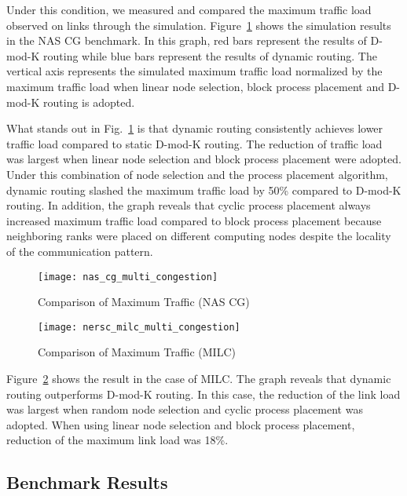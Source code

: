 Under this condition, we measured and compared the maximum traffic load
observed on links through the simulation.
Figure~\ref{fig:nas-cg-multi-congestion} shows the simulation results in
the NAS CG benchmark. In this graph, red bars represent the results of
\mbox{D-mod-K} routing while blue bars represent the results of dynamic
routing. The vertical axis represents the simulated maximum traffic load
normalized by the maximum traffic load when linear node selection, block
process placement and \mbox{D-mod-K} routing is adopted.

What stands out in Fig.~\ref{fig:nas-cg-multi-congestion} is that
dynamic routing consistently achieves lower traffic load compared to
static \mbox{D-mod-K} routing. The reduction of traffic load was largest
when linear node selection and block process placement were adopted.
Under this combination of node selection and the process placement
algorithm, dynamic routing slashed the maximum traffic load by 50\%
compared to \mbox{D-mod-K} routing. In addition, the graph reveals that
cyclic process placement always increased maximum traffic load compared
to block process placement because neighboring ranks were placed on
different computing nodes despite the locality of the communication
pattern.

\begin{figure}
    \centering
    \texttt{[image: nas\_cg\_multi\_congestion]}
    \caption{Comparison of Maximum Traffic (NAS CG)}%
    \label{fig:nas-cg-multi-congestion}
\end{figure}

\begin{figure}
    \centering
    \texttt{[image: nersc\_milc\_multi\_congestion]}
    \caption{Comparison of Maximum Traffic (MILC)}%
    \label{fig:nersc-milc-multi-congestion}
\end{figure}

Figure~\ref{fig:nersc-milc-multi-congestion} shows the result in the
case of MILC\@. The graph reveals that dynamic routing outperforms
\mbox{D-mod-K} routing. In this case, the reduction of the link load was
largest when random node selection and cyclic process placement was
adopted. When using linear node selection and block process placement,
reduction of the maximum link load was 18\%.

\subsection{Benchmark Results}

